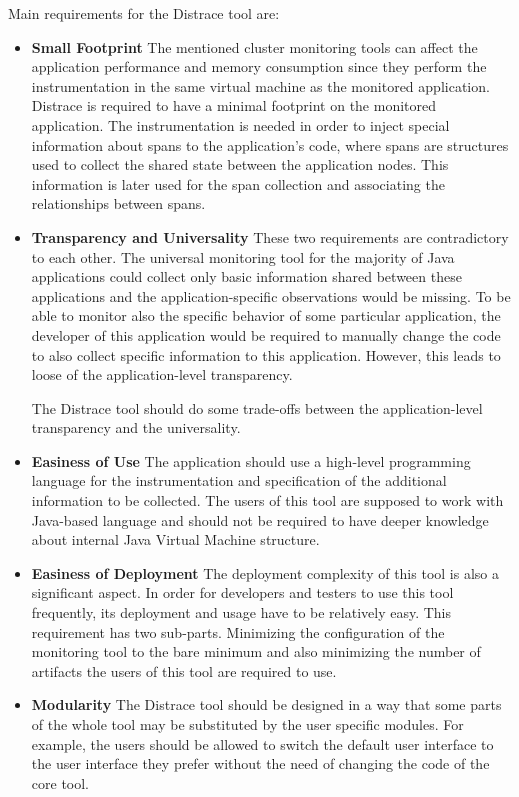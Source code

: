Main requirements for the Distrace tool are:
\begin{itemize}
	\item \textbf{Small Footprint} \newline
	 The mentioned cluster monitoring tools can affect the application performance and memory consumption since they perform the instrumentation in the same virtual machine as the monitored application. Distrace is required to have a minimal footprint on the monitored application. The instrumentation is needed in order to inject special information about spans to the application's code, where spans are structures used to collect the shared state between the application nodes. This information is later used for the span collection and associating the relationships between spans.
	\item \textbf{Transparency and Universality} \newline
	These two requirements are contradictory to each other. The universal monitoring tool for the majority of Java applications could collect only basic information shared between these applications and the application-specific observations would be missing. To be able to monitor also the specific behavior of some particular application, the developer of this application would be required to manually change the code to also collect specific information to this application. However, this leads to loose of the application-level transparency. 
	
	The Distrace tool should do some trade-offs between the application-level transparency and the universality. 
	
	\item \textbf{Easiness of Use} \newline
	The application should use a high-level programming language for the instrumentation and specification of the additional information to be collected. The users of this tool are supposed to work with Java-based language and should not be required to have deeper knowledge about internal Java Virtual Machine structure.
	\item \textbf{Easiness of Deployment} \newline
	The deployment complexity of this tool is also a significant aspect. In order for developers and testers to use this tool frequently, its deployment and usage have to be relatively easy. This requirement has two sub-parts. Minimizing the configuration of the monitoring tool to the bare minimum and also minimizing the number of artifacts the users of this tool are required to use.
	\item \textbf{Modularity} \newline
	The Distrace tool should be designed in a way that some parts of the whole tool may be substituted by the user specific modules. For example, the users should be allowed to switch the default user interface to the user interface they prefer without the need of changing the code of the core tool.
\end{itemize}

